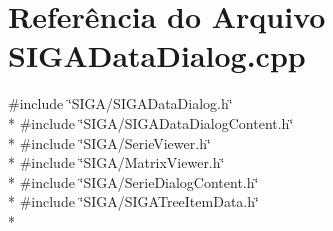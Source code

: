 \section{Referência do Arquivo S\+I\+G\+A\+Data\+Dialog.\+cpp}
\label{_s_i_g_a_data_dialog_8cpp}
{\ttfamily \#include \char`\"{}S\+I\+G\+A/\+S\+I\+G\+A\+Data\+Dialog.\+h\char`\"{}}\\*
{\ttfamily \#include \char`\"{}S\+I\+G\+A/\+S\+I\+G\+A\+Data\+Dialog\+Content.\+h\char`\"{}}\\*
{\ttfamily \#include \char`\"{}S\+I\+G\+A/\+Serie\+Viewer.\+h\char`\"{}}\\*
{\ttfamily \#include \char`\"{}S\+I\+G\+A/\+Matrix\+Viewer.\+h\char`\"{}}\\*
{\ttfamily \#include \char`\"{}S\+I\+G\+A/\+Serie\+Dialog\+Content.\+h\char`\"{}}\\*
{\ttfamily \#include \char`\"{}S\+I\+G\+A/\+S\+I\+G\+A\+Tree\+Item\+Data.\+h\char`\"{}}\\*
